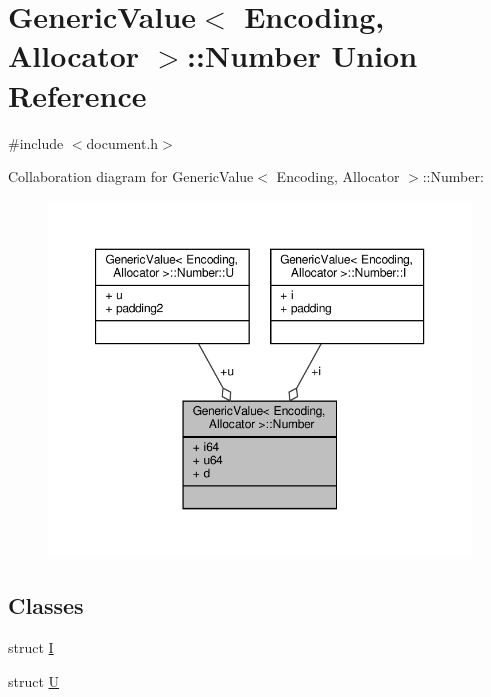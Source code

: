 \hypertarget{unionGenericValue_1_1Number}{}\section{Generic\+Value$<$ Encoding, Allocator $>$\+:\+:Number Union Reference}
\label{unionGenericValue_1_1Number}


{\ttfamily \#include $<$document.\+h$>$}



Collaboration diagram for Generic\+Value$<$ Encoding, Allocator $>$\+:\+:Number\+:
\nopagebreak
\begin{figure}[H]
\begin{center}
\leavevmode
\includegraphics[width=350pt]{unionGenericValue_1_1Number__coll__graph}
\end{center}
\end{figure}
\subsection*{Classes}
\begin{DoxyCompactItemize}
\item 
struct \hyperlink{structGenericValue_1_1Number_1_1I}{I}
\item 
struct \hyperlink{structGenericValue_1_1Number_1_1U}{U}
\end{DoxyCompactItemize}
